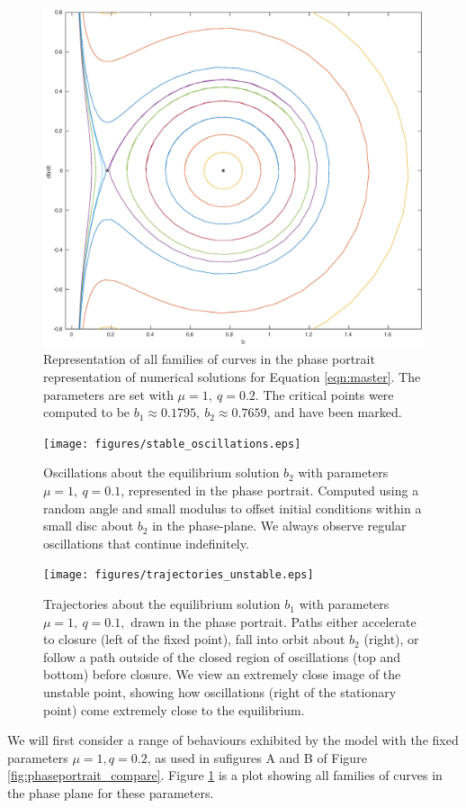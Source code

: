 \begin{figure}[h!]
    \centering
    \includegraphics[width=\linewidth]{figures/phaseportrait}
    \caption{
        Representation of all families of curves in the phase portrait representation of numerical solutions for Equation \ref{eqn:master}.
        The parameters are set with $\mu = 1,~q=0.2$. The critical points were computed to be $b_1 \approx 0.1795,~ b_2 \approx 0.7659$, and have been marked.
    }
    \label{fig:phaseportrait_oscillations}
\end{figure}

\begin{figure}[h!]
    \centering
    \texttt{[image: figures/stable\_oscillations.eps]}
    \caption{
        Oscillations about the equilibrium solution $b_2$ with parameters $\mu=1,~q=0.1$, represented in the phase portrait.
        Computed using a random angle and small modulus to offset initial conditions within a small disc about $b_2$ in the phase-plane.
        We always observe regular oscillations that continue indefinitely.
    }
    \label{fig:stable_oscillations}
\end{figure}

\begin{figure}[h!]
    \centering
    \texttt{[image: figures/trajectories\_unstable.eps]}
    \caption{
        Trajectories about the equilibrium solution $b_1$ with parameters $\mu=1,~q=0.1,$ drawn in the phase portrait.
        Paths either accelerate to closure (left of the fixed point), fall into orbit about $b_2$ (right),
        or follow a path outside of the closed region of oscillations (top and bottom) before closure.
        We view an extremely close image of the unstable point,
        showing how oscillations (right of the stationary point) come extremely close to the equilibrium.
    }
    \label{fig:unstable_trajectories}
\end{figure}
We will first consider a range of behaviours exhibited by the model with the fixed parameters $\mu=1, q=0.2$,
as used in sufigures A and B of Figure \ref{fig:phaseportrait_compare}.
Figure \ref{fig:phaseportrait_oscillations} is a plot showing all families of curves in the phase plane for these parameters.

